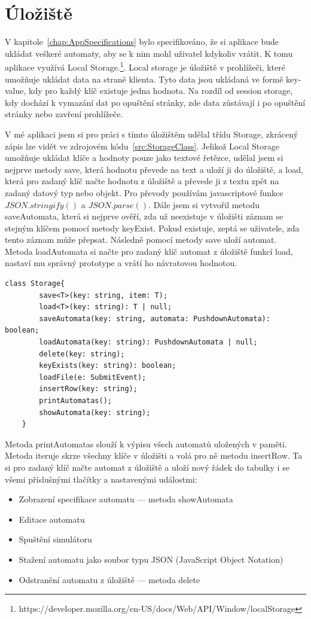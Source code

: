 \section{Úložiště}
V kapitole~\ref{chap:AppSpecifications} bylo specifikováno, že si aplikace bude ukládat veškeré automaty, aby se k nim mohl uživatel kdykoliv vrátit. K tomu aplikace využívá Local Storage.\footnote{https://developer.mozilla.org/en-US/docs/Web/API/Window/localStorage}. Local storage je úložiště v prohlížeči, které umožňuje ukládat data na straně klienta. Tyto data jsou ukládaná ve formě key-value, kdy pro každý klíč existuje jedna hodnota. Na rozdíl od session storage, kdy dochází k vymazání dat po opuštění stránky, zde data zůstávají i po opuštění stránky nebo zavření prohlížeče.

V mé aplikaci jsem si pro práci s tímto úložištěm udělal třídu Storage, zkrácený zápis lze vidět ve zdrojovém kódu~\ref{src:StorageClass}. Jelikož Local Storage umožňuje ukládat klíče a hodnoty pouze jako textové řetězce, udělal jsem si nejprve metody save, která hodnotu převede na text a uloží ji do úložiště, a load, která pro zadaný klíč načte hodnotu z úložiště a převede ji z textu zpět na zadaný datový typ nebo objekt. Pro převody používám javascriptové funkce $JSON.stringify()$ a $JSON.parse()$. Dále jsem si vytvořil metodu saveAutomata, která si nejprve ověří, zda už neexistuje v úložišti záznam se stejným klíčem pomocí metody keyExist. Pokud existuje, zeptá se uživatele, zda tento záznam může přepsat. Následně pomocí metody save uloží automat. Metoda loadAutomata si načte pro zadaný klíč automat z úložiště funkcí load, nastaví mu správný prototype a vrátí ho návratovou hodnotou. 

\begin{lstlisting}[label=src:StorageClass, caption={třída Storage}]
    class Storage{
        save<T>(key: string, item: T);
        load<T>(key: string): T | null;
        saveAutomata(key: string, automata: PushdownAutomata): boolean;
        loadAutomata(key: string): PushdownAutomata | null;
        delete(key: string);
        keyExists(key: string): boolean;
        loadFile(e: SubmitEvent);
        insertRow(key: string);
        printAutomatas();
        showAutomata(key: string);
    }
\end{lstlisting}

Metoda printAutomatas slouží k výpisu všech automatů uložených v paměti. Metoda iteruje skrze všechny klíče v úložišti a volá pro ně metodu insertRow. Ta si pro zadaný klíč načte automat z úložiště a uloží nový řádek do tabulky i se všemi příslušnými tlačítky a nastavenými událostmi:
\begin{itemize}
    \item Zobrazení specifikace automatu --- metoda showAutomata
    \item Editace automatu
    \item Spuštění simulátoru
    \item Stažení automatu jako soubor typu JSON (JavaScript Object Notation)
    \item Odstranění automatu z úložiště --- metoda delete
\end{itemize}


